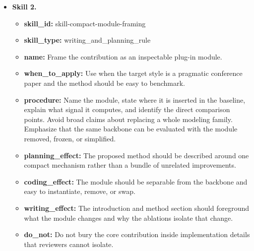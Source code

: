\documentclass{opendatalab}
\begin{document}
\begin{tcolorbox}
\begin{itemize}
  \item \textbf{Skill 2.}
  \begin{itemize}\setlength\itemsep{1pt}
    \item \textbf{skill\_id:} skill-compact-module-framing
    \item \textbf{skill\_type:} writing\_and\_planning\_rule
    \item \textbf{name:} Frame the contribution as an inspectable plug-in module.
    \item \textbf{when\_to\_apply:} Use when the target style is a pragmatic conference paper and the method should be easy to benchmark.
    \item \textbf{procedure:} Name the module, state where it is inserted in the baseline, explain what signal it computes, and identify the direct comparison points. Avoid broad claims about replacing a whole modeling family. Emphasize that the same backbone can be evaluated with the module removed, frozen, or simplified.
    \item \textbf{planning\_effect:} The proposed method should be described around one compact mechanism rather than a bundle of unrelated improvements.
    \item \textbf{coding\_effect:} The module should be separable from the backbone and easy to instantiate, remove, or swap.
    \item \textbf{writing\_effect:} The introduction and method section should foreground what the module changes and why the ablations isolate that change.
    \item \textbf{do\_not:} Do not bury the core contribution inside implementation details that reviewers cannot isolate.
  \end{itemize}
\end{itemize}
\end{tcolorbox}
\end{document}
